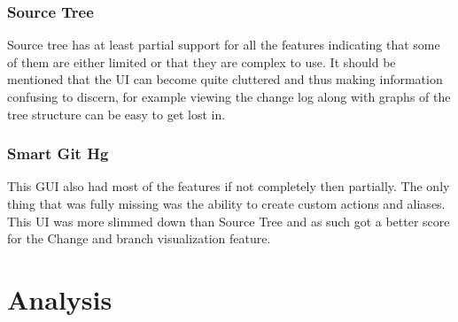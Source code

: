 \documentclass[a4paper,oneside]{bth} %
\begin{document}
				\subsection{Source Tree}
				Source tree has at least partial support for all the features indicating that some of them are either limited or that they are complex to use. It should be mentioned that the UI can become quite cluttered and thus making information confusing to discern, for example viewing the change log along with graphs of the tree structure can be easy to get lost in.
				\subsection{Smart Git Hg}
				This GUI also had most of the features if not completely then partially. The only thing that was fully missing was the ability to create custom actions and aliases. This UI was more slimmed down than Source Tree and as such got a better score for the Change and branch visualization feature.
		
		\chapter{Analysis}
\end{document}
